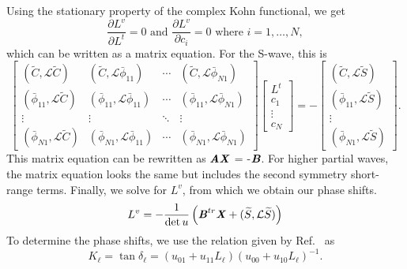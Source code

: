 \documentclass[preprint,showpacs,preprintnumbers,amsmath,amssymb,longbibliography,pra,aps]{revtex4-1}
\newcommand{\beq}{\begin{equation}}
\newcommand{\eeq}{\end{equation}}
\begin{document}
Using the stationary property of the complex Kohn functional, we get
\beq
\frac{\partial L^v}{\partial L^t} = 0  \text{ and } \frac{\partial L^v}{\partial c_i} = 0 \text{ where $i = 1,\ldots,N$},
\label{eq:ComplexKohnStationary}
\eeq
which can be written as a matrix equation. For the S-wave, this is
\begin{equation}
\label{eq:ComplexKohnMatrix}
\begin{bmatrix} 
 (\widetilde{C},\mathcal{L}\widetilde{C}) & (\widetilde{C},\mathcal{L}\bar{\phi}_{11}) & \cdots & (\widetilde{C},\mathcal{L}\bar{\phi}_{N1})\\
 (\bar{\phi}_{11},\mathcal{L}\widetilde{C}) & (\bar{\phi}_{11},\mathcal{L}\bar{\phi}_{11}) & \cdots & (\bar{\phi}_{11},\mathcal{L}\bar{\phi}_{N1})\\
 \vdots & \vdots & \ddots & \vdots \\
 (\bar{\phi}_{N1},\mathcal{L}\widetilde{C}) & (\bar{\phi}_{N1},\mathcal{L}\bar{\phi}_{11}) & \cdots & (\bar{\phi}_{N1},\mathcal{L}\bar{\phi}_{N1})
\end{bmatrix}
\begin{bmatrix}
L^t\\
c_1\\
\vdots\\
c_N
\end{bmatrix}
= -
\begin{bmatrix}
(\widetilde{C},\mathcal{L}\widetilde{S}) \\
(\bar{\phi}_{11},\mathcal{L}\widetilde{S}) \\
\vdots \\
(\bar{\phi}_{N1},\mathcal{L}\widetilde{S})
\end{bmatrix}.
\end{equation}
This matrix equation can be rewritten as $\textbf{\emph{AX}}$ = -$\textbf{\emph{B}}$. For higher partial waves, the matrix equation looks the same but includes the second symmetry short-range terms. Finally, we solve for $L^v$, from which we obtain our phase shifts.
\begin{equation}
L^v = -\frac{1}{\det u} \left( \textbf{\emph{B}}^{tr} \textbf{\emph{X}} + (\widetilde{S},\mathcal{L} \widetilde{S}) \right)
\end{equation}
To determine the phase shifts, we use the relation given by Ref.~\cite{Lucchese1989} as
\begin{equation}
\label{eq:GenKohnL}
K_\ell = \tan \delta_\ell = (u_{01} + u_{11} L_\ell)(u_{00} + u_{10} L_\ell)^{-1}.
\end{equation}
\end{document}
